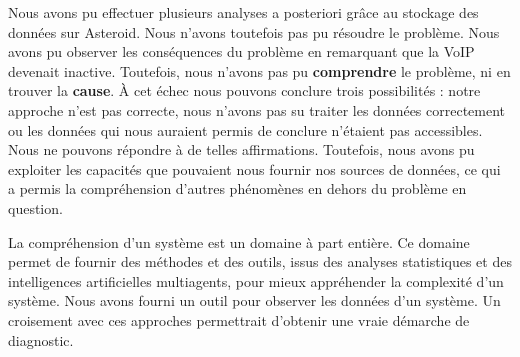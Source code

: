 Nous avons pu effectuer plusieurs analyses a posteriori grâce au stockage des données sur Asteroid. Nous n'avons toutefois pas pu résoudre le problème. Nous avons pu observer les conséquences du problème en remarquant que la VoIP devenait inactive. Toutefois, nous n'avons pas pu \textbf{comprendre} le problème, ni en trouver la \textbf{cause}. À cet échec nous pouvons conclure trois possibilités : notre approche n'est pas correcte, nous n'avons pas su traiter les données correctement ou les données qui nous auraient permis de conclure n'étaient pas accessibles. Nous ne pouvons répondre à de telles affirmations. Toutefois, nous avons pu exploiter les capacités que pouvaient nous fournir nos sources de données, ce qui a permis la compréhension d'autres phénomènes en dehors du problème en question.

La compréhension d'un système est un domaine à part entière. Ce domaine permet de fournir des méthodes et des outils, issus des analyses statistiques et des intelligences artificielles multiagents, pour mieux appréhender la complexité d'un système. Nous avons fourni un outil pour observer les données d'un système. Un croisement avec ces approches permettrait d'obtenir une vraie démarche de diagnostic.